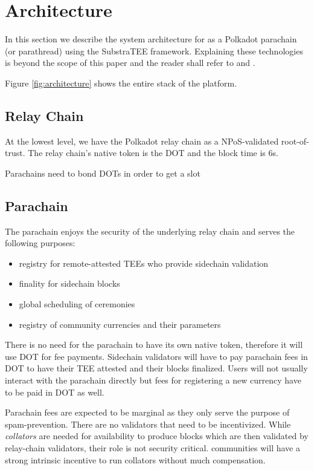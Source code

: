 \documentclass[conference]{IEEEtran}
\begin{document}
\section{Architecture}

In this section we describe the system architecture for \encointer as a Polkadot parachain (or parathread) using the SubstraTEE framework. Explaining these technologies is beyond the scope of this paper and the reader shall refer to \cite{polkadot} and \cite{substraTEE}.

Figure \ref{fig:architecture} shows the entire stack of the \encointer platform. 

\subsection{Relay Chain}
At the lowest level, we have the Polkadot relay chain as a NPoS-validated root-of-trust. The relay chain's native token is the DOT and the block time is 6s. 

Parachains need to bond DOTs in order to get a slot 

\subsection{Parachain}
The \encointer parachain enjoys the security of the underlying relay chain and serves the following purposes: 

\begin{itemize}
	\item registry for remote-attested TEEs who provide sidechain validation
	\item finality for sidechain blocks
	\item global scheduling of ceremonies
	\item registry of community currencies and their parameters
\end{itemize}

There is no need for the parachain to have its own native token, therefore it will use DOT for fee payments. Sidechain validators will have to pay parachain fees in DOT to have their TEE attested and their blocks finalized. 
Users will not usually interact with the parachain directly but fees for registering a new currency have to be paid in DOT as well. 

Parachain fees are expected to be marginal as they only serve the purpose of spam-prevention. There are no validators that need to be incentivized. While \emph{collators} are needed for availability to produce blocks which are then validated by relay-chain validators, their role is not security critical. \encointer communities will have a strong intrinsic incentive to run collators without much  compensation.
\end{document}
